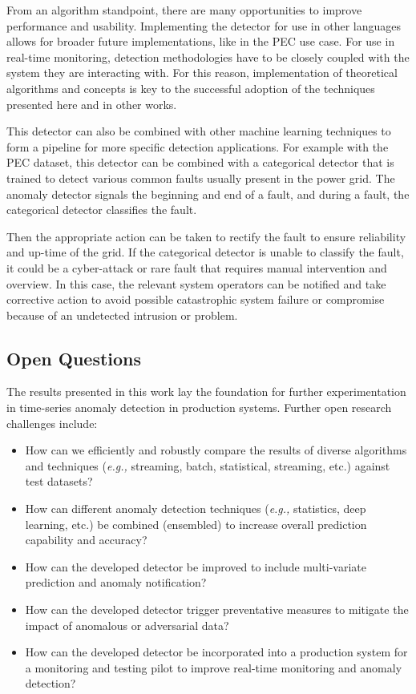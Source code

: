 From an algorithm standpoint, there are many opportunities to improve performance and usability. Implementing the detector for use in other languages allows for broader future implementations, like in the PEC use case. For use in real-time monitoring, detection methodologies have to be closely coupled with the system they are interacting with. For this reason, implementation of theoretical algorithms and concepts is key to the successful adoption of the techniques presented here and in other works.

This detector can also be combined with other machine learning techniques to form a pipeline for more specific detection applications. For example with the PEC dataset, this detector can be combined with a categorical detector that is trained to detect various common faults usually present in the power grid. The anomaly detector signals the beginning and end of a fault, and during a fault, the categorical detector classifies the fault.

Then the appropriate action can be taken to rectify the fault to ensure reliability and up-time of the grid. If the categorical detector is unable to classify the fault, it could be a cyber-attack or rare fault that requires manual intervention and overview. In this case, the relevant system operators can be notified and take corrective action to avoid possible catastrophic system failure or compromise because of an undetected intrusion or problem. 

\subsection{Open Questions}
The results presented in this work lay the foundation for further experimentation in time-series anomaly detection in production systems. Further open research challenges include: 

\begin{itemize}
    \item How can we efficiently and robustly compare the results of diverse algorithms and techniques (\textit{e.g.,} streaming, batch, statistical, streaming, etc.) against test datasets?
    \item How can different anomaly detection techniques (\textit{e.g.,} statistics, deep learning, etc.) be combined (ensembled) to increase overall prediction capability and accuracy?
    \item How can the developed detector be improved to include multi-variate prediction and anomaly notification?
    \item How can the developed detector trigger preventative measures to mitigate the impact of anomalous or adversarial data?
    \item How can the developed detector be incorporated into a production system for a monitoring and testing pilot to improve real-time monitoring and anomaly detection? 
\end{itemize}

